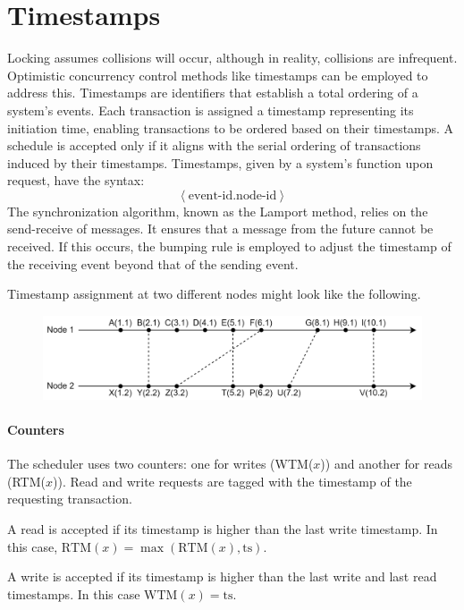 \section{Timestamps}

Locking assumes collisions will occur, although in reality, collisions are infrequent.
Optimistic concurrency control methods like timestamps can be employed to address this. 
Timestamps are identifiers that establish a total ordering of a system's events. 
Each transaction is assigned a timestamp representing its initiation time, enabling transactions to be ordered based on their timestamps. 
A schedule is accepted only if it aligns with the serial ordering of transactions induced by their timestamps. 
Timestamps, given by a system's function upon request, have the syntax:
\[\left\langle \text{event-id}.\text{node-id} \right\rangle \]
The synchronization algorithm, known as the Lamport method, relies on the send-receive of messages. 
It ensures that a message from the future cannot be received. 
If this occurs, the bumping rule is employed to adjust the timestamp of the receiving event beyond that of the sending event.  
\begin{example}
    Timestamp assignment at two different nodes might look like the following.
    \begin{figure}[H]
        \centering
        \includegraphics[width=0.75\linewidth]{images/timestamps.png}
    \end{figure}
\end{example}

\paragraph*{Counters}
The scheduler uses two counters: one for writes (WTM($x$)) and another for reads (RTM($x$)).
Read and write requests are tagged with the timestamp of the requesting transaction.

A read is accepted if its timestamp is higher than the last write timestamp.
In this case, $\text{RTM}(x)=\max(\text{RTM}(x),\text{ts})$. 

A write is accepted if its timestamp is higher than the last write and last read timestamps. 
In this case $\text{WTM}(x)=\text{ts}$. 


